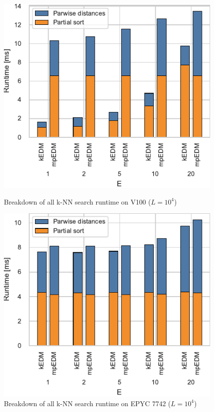 \documentclass{acmart}
\begin{document}
\begin{figure}
    \centering
    \begin{minipage}{.5\textwidth}
    \includegraphics[width=.9\linewidth]{figs/breakdown_knn_v100}
    \caption{Breakdown of all k-NN search runtime on V100 ($L=10^4$)}%
    \label{fig:breakdown-knn-v100}
    \end{minipage}%
    \begin{minipage}{.5\textwidth}
    \includegraphics[width=.9\linewidth]{figs/breakdown_knn_epyc}
    \caption{Breakdown of all k-NN search runtime on EPYC 7742 ($L=10^4$)}%
    \label{fig:breakdown-knn-epyc}
    \end{minipage}
\end{figure}
\end{document}
